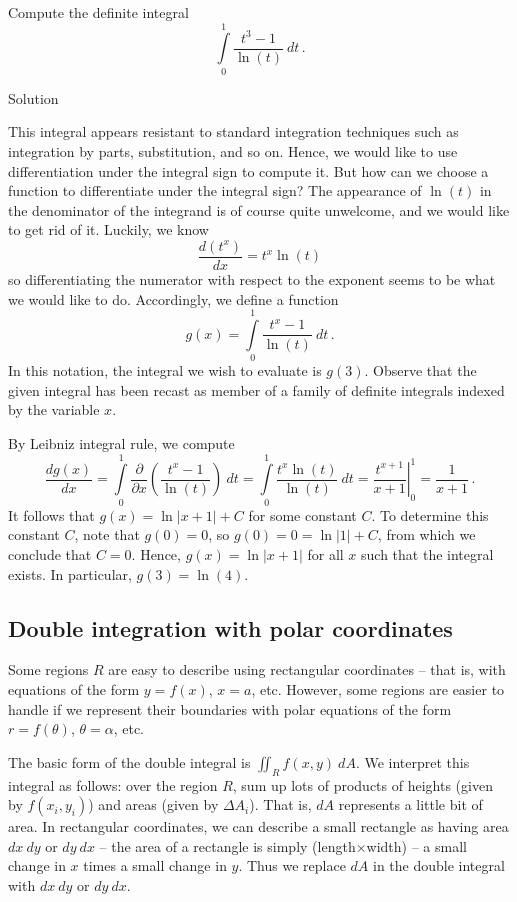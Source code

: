 \begin{example}
Compute the definite integral
$$
\int\limits_0^1\dfrac{t^3-1}{\ln(t)}\ dt\,.
$$

Solution 


This integral appears resistant to standard integration techniques such as integration by parts, substitution, and so on. Hence, we would like to use differentiation under the integral sign to compute it. But how can we choose a function to differentiate under the integral sign? The appearance of $\ln(t)$ in the denominator of the integrand is of course quite unwelcome, and we would like to get rid of it. Luckily, we know 
$$
\dfrac{d(t^x)}{dx}=t^x\ln(t)
$$
so differentiating the numerator with respect to the exponent seems to be what we would like to do. Accordingly, we define a function 
$$
g(x)=\int\limits_0^1\dfrac{t^x-1}{\ln(t)}\ dt\,.
$$
In this notation, the integral we wish to evaluate is $g(3)$. Observe that the given integral has been recast as member of a family of definite integrals indexed by the variable $x$.

By Leibniz integral rule, we compute 
$$
\dfrac{dg(x)}{dx}=\int\limits_0^1\dfrac{\partial}{\partial x}\left(\dfrac{t^x-1}{\ln(t)}\right)\ dt=\int\limits_0^1\dfrac{t^x\ln(t)}{\ln(t)}\ dt=\left.\dfrac{t^{x+1}}{x+1}\right|_0^1=\dfrac{1}{x+1}\,.
$$
It follows that $g(x)=\ln|x+1|+C$ for some constant $C$. To determine this constant $C$, note that $g(0)=0$, so $g(0)=0=\ln|1|+C$, from which we conclude that $C=0$. Hence, $g(x)=\ln|x+1|$ for all $x$ such that the integral exists. In particular,  $g(3)=\ln(4)$.
\end{example}


\subsection{Double integration with polar coordinates}
\label{sec:double_int_polar}
Some regions $R$ are easy to describe using rectangular coordinates -- that is, with equations of the form $y=f(x)$, $x=a$, etc. However, some regions are easier to handle if we represent their boundaries with polar equations of the form $r=f(\theta)$, $\theta = \alpha$, etc. 

The basic form of the double integral is $\iint_R f(x,y)\ dA$. We interpret this integral as follows: over the region $R$, sum up lots of products of heights (given by $f(x_i,y_i)$) and areas (given by $\Delta A_i$). That is, $dA$ represents a little bit of area. In rectangular coordinates, we can describe a small rectangle as having area $dx\ dy$ or $dy\ dx$ -- the area of a rectangle is simply (length$\times$width) -- a small change in $x$ times a small change in $y$. Thus we replace $dA$ in the double integral with $dx\ dy$ or $dy\ dx$.

